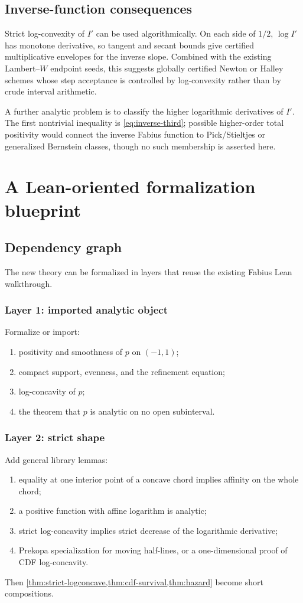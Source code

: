 \documentclass[11pt,oneside]{article}
\theoremstyle{definition}
\theoremstyle{remark}
\begin{document}
\subsection{Inverse-function consequences}
Strict log-convexity of $I'$ can be used algorithmically.  On each side of $1/2$,
$\log I'$ has monotone derivative, so tangent and secant bounds give certified
multiplicative envelopes for the inverse slope.  Combined with the existing
Lambert--$W$ endpoint seeds, this suggests globally certified Newton or Halley
schemes whose step acceptance is controlled by log-convexity rather than by crude
interval arithmetic.

A further analytic problem is to classify the higher logarithmic derivatives of
$I'$.  The first nontrivial inequality is \eqref{eq:inverse-third}; possible
higher-order total positivity would connect the inverse Fabius function to
Pick/Stieltjes or generalized Bernstein classes, though no such membership is
asserted here.

\section{A Lean-oriented formalization blueprint}

\subsection{Dependency graph}
The new theory can be formalized in layers that reuse the existing Fabius Lean
walkthrough.

\subsubsection*{Layer 1: imported analytic object}
Formalize or import:
\begin{enumerate}
\item positivity and smoothness of $p$ on $(-1,1)$;
\item compact support, evenness, and the refinement equation;
\item log-concavity of $p$;
\item the theorem that $p$ is analytic on no open subinterval.
\end{enumerate}

\subsubsection*{Layer 2: strict shape}
Add general library lemmas:
\begin{enumerate}
\item equality at one interior point of a concave chord implies affinity on the
whole chord;
\item a positive function with affine logarithm is analytic;
\item strict log-concavity implies strict decrease of the logarithmic derivative;
\item Prekopa specialization for moving half-lines, or a one-dimensional proof of
CDF log-concavity.
\end{enumerate}
Then \cref{thm:strict-logconcave,thm:cdf-survival,thm:hazard} become short
compositions.
\end{document}
